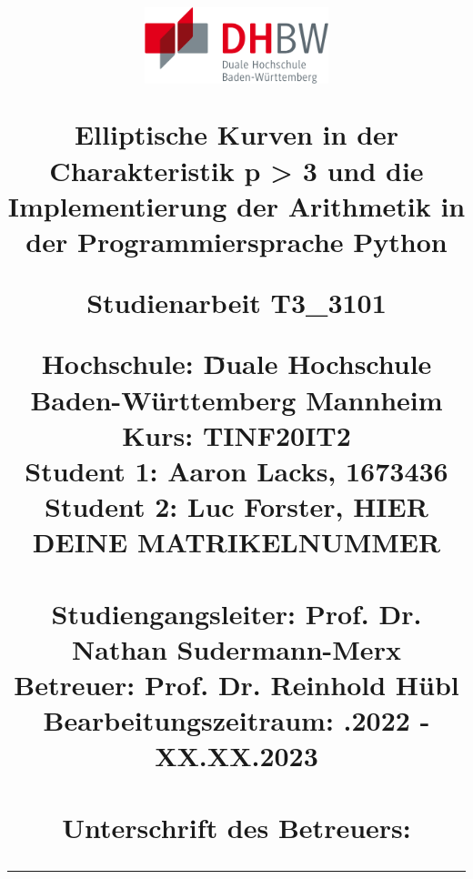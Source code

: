\begin{titlepage}
\centering
\title{		
	\includegraphics[width=0.4\textwidth]{grafiken/dhbw.png}\\       		 
	\vspace{1.0cm}
          
    \begin{singlespacing}
    {\Large Elliptische Kurven in der Charakteristik p > 3 und die Implementierung der Arithmetik in der Programmiersprache Python}	\\
    \vspace{1.8cm}	
    \begin{normalfont}
	{\large Studienarbeit T3\_3101}
	\end{normalfont}
    \vspace{1.8cm}
    \begin{onehalfspacing}
    \begin{normalsize}
	\begin{normalfont}
	\begin{tabbing}
	Hochschule: \hspace{2.7cm} \= Duale Hochschule Baden-Württemberg Mannheim\\
	Kurs: \> TINF20IT2\\	
	Student 1: \> Aaron Lacks, 1673436\\
	Student 2: \> Luc Forster, HIER DEINE MATRIKELNUMMER\\		
	\vspace{1.0cm}\\
	Studiengangsleiter:  \> Prof. Dr. Nathan Sudermann-Merx\\
	Betreuer: \> Prof. Dr. Reinhold Hübl\\	
	Bearbeitungszeitraum: .2022 - XX.XX.2023\\	
	\vspace{1.0cm}\\
	Unterschrift des Betreuers: \> {\rule{6cm}{1pt}}\\
	\end{tabbing}
	\end{normalfont}
	\end{normalsize}
	\end{onehalfspacing}
	\end{singlespacing}	
}
\author{}
\date{} 
\maketitle		
\end{titlepage}